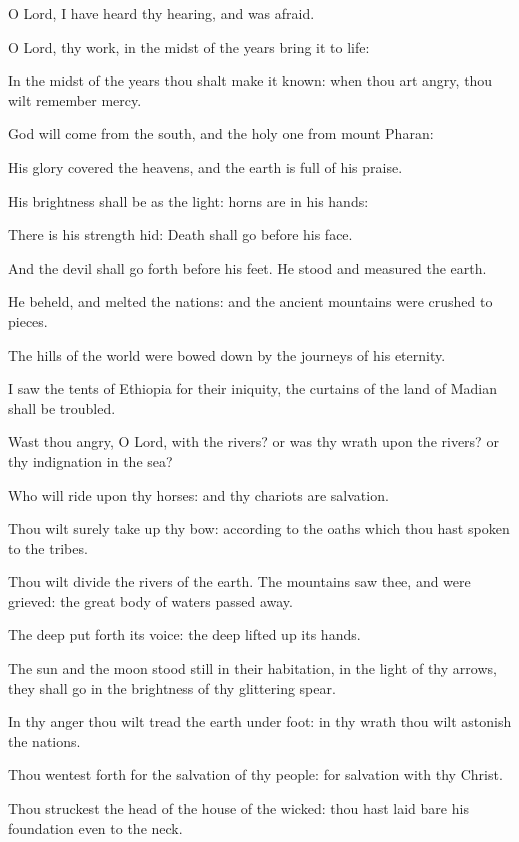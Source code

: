 ﻿\item O Lord, I have heard thy hearing, and was afraid.
\item O Lord, thy work, in the midst of the years bring it to life:
\item In the midst of the years thou shalt make it known: when thou art angry, thou wilt remember mercy.
\item God will come from the south, and the holy one from mount Pharan:
\item His glory covered the heavens, and the earth is full of his praise.
\item His brightness shall be as the light: horns are in his hands:
\item There is his strength hid: Death shall go before his face.
\item And the devil shall go forth before his feet. He stood and measured the earth.
\item He beheld, and melted the nations: and the ancient mountains were crushed to pieces.
\item The hills of the world were bowed down by the journeys of his eternity.
\item I saw the tents of Ethiopia for their iniquity, the curtains of the land of Madian shall be troubled.
\item Wast thou angry, O Lord, with the rivers? or was thy wrath upon the rivers? or thy indignation in the sea?
\item Who will ride upon thy horses: and thy chariots are salvation.
\item Thou wilt surely take up thy bow: according to the oaths which thou hast spoken to the tribes.
\item Thou wilt divide the rivers of the earth. The mountains saw thee, and were grieved: the great body of waters passed away.
\item The deep put forth its voice: the deep lifted up its hands.
\item The sun and the moon stood still in their habitation, in the light of thy arrows, they shall go in the brightness of thy glittering spear.
\item In thy anger thou wilt tread the earth under foot: in thy wrath thou wilt astonish the nations.
\item Thou wentest forth for the salvation of thy people: for salvation with thy Christ.\ifx\enlinebreakafternineteen\undefined\else\\\fi
\item Thou struckest the head of the house of the wicked: thou hast laid bare his foundation even to the neck.
